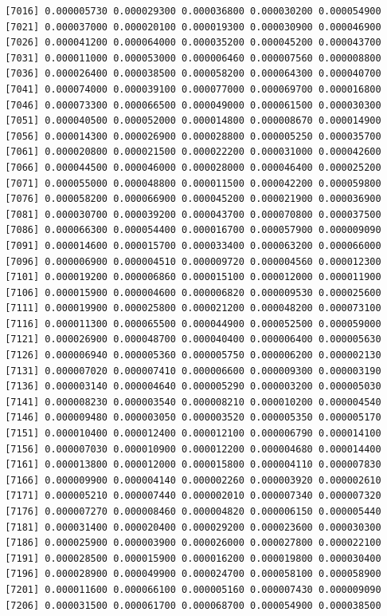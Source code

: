 \documentclass[]{article}
\begin{document}
\begin{verbatim}
 [7016] 0.000005730 0.000029300 0.000036800 0.000030200 0.000054900
 [7021] 0.000037000 0.000020100 0.000019300 0.000030900 0.000046900
 [7026] 0.000041200 0.000064000 0.000035200 0.000045200 0.000043700
 [7031] 0.000011000 0.000053000 0.000006460 0.000007560 0.000008800
 [7036] 0.000026400 0.000038500 0.000058200 0.000064300 0.000040700
 [7041] 0.000074000 0.000039100 0.000077000 0.000069700 0.000016800
 [7046] 0.000073300 0.000066500 0.000049000 0.000061500 0.000030300
 [7051] 0.000040500 0.000052000 0.000014800 0.000008670 0.000014900
 [7056] 0.000014300 0.000026900 0.000028800 0.000005250 0.000035700
 [7061] 0.000020800 0.000021500 0.000022200 0.000031000 0.000042600
 [7066] 0.000044500 0.000046000 0.000028000 0.000046400 0.000025200
 [7071] 0.000055000 0.000048800 0.000011500 0.000042200 0.000059800
 [7076] 0.000058200 0.000066900 0.000045200 0.000021900 0.000036900
 [7081] 0.000030700 0.000039200 0.000043700 0.000070800 0.000037500
 [7086] 0.000066300 0.000054400 0.000016700 0.000057900 0.000009090
 [7091] 0.000014600 0.000015700 0.000033400 0.000063200 0.000066000
 [7096] 0.000006900 0.000004510 0.000009720 0.000004560 0.000012300
 [7101] 0.000019200 0.000006860 0.000015100 0.000012000 0.000011900
 [7106] 0.000015900 0.000004600 0.000006820 0.000009530 0.000025600
 [7111] 0.000019900 0.000025800 0.000021200 0.000048200 0.000073100
 [7116] 0.000011300 0.000065500 0.000044900 0.000052500 0.000059000
 [7121] 0.000026900 0.000048700 0.000040400 0.000006400 0.000005630
 [7126] 0.000006940 0.000005360 0.000005750 0.000006200 0.000002130
 [7131] 0.000007020 0.000007410 0.000006600 0.000009300 0.000003190
 [7136] 0.000003140 0.000004640 0.000005290 0.000003200 0.000005030
 [7141] 0.000008230 0.000003540 0.000008210 0.000010200 0.000004540
 [7146] 0.000009480 0.000003050 0.000003520 0.000005350 0.000005170
 [7151] 0.000010400 0.000012400 0.000012100 0.000006790 0.000014100
 [7156] 0.000007030 0.000010900 0.000012200 0.000004680 0.000014400
 [7161] 0.000013800 0.000012000 0.000015800 0.000004110 0.000007830
 [7166] 0.000009900 0.000004140 0.000002260 0.000003920 0.000002610
 [7171] 0.000005210 0.000007440 0.000002010 0.000007340 0.000007320
 [7176] 0.000007270 0.000008460 0.000004820 0.000006150 0.000005440
 [7181] 0.000031400 0.000020400 0.000029200 0.000023600 0.000030300
 [7186] 0.000025900 0.000003900 0.000026000 0.000027800 0.000022100
 [7191] 0.000028500 0.000015900 0.000016200 0.000019800 0.000030400
 [7196] 0.000028900 0.000049900 0.000024700 0.000058100 0.000058900
 [7201] 0.000011600 0.000066100 0.000005160 0.000007430 0.000009090
 [7206] 0.000031500 0.000061700 0.000068700 0.000054900 0.000038500

\end{verbatim}
\end{document}
